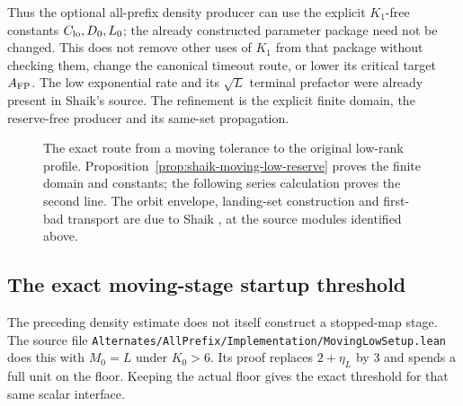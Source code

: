 \documentclass[11pt]{article}
\theoremstyle{remark}\newtheorem{remark}[proposition]{Remark}
\begin{document}
Thus the optional all-prefix density producer can use the explicit
\(K_1\)-free constants \(C_{\rm lo},D_0,L_0\); the already constructed
parameter package need not be changed. This does not remove other
uses of \(K_1\) from that package without checking them, change the
canonical timeout route, or lower its critical target \(A_{\rm FP}\).
The low exponential rate and its \(\sqrt L\) terminal prefactor were
already present in Shaik's source. The refinement is the explicit
finite domain, the reserve-free producer and its same-set propagation.

\begin{figure}[ht]
\centering
{}
\caption{The exact route from a moving tolerance to the original low-rank
profile. Proposition~\ref{prop:shaik-moving-low-reserve} proves the finite
domain and constants; the following series calculation proves the second
line. The orbit envelope, landing-set construction and first-bad transport
are due to Shaik \cite{Shaik2026v324}, at the source modules identified above.}
\end{figure}

\subsection{The exact moving-stage startup threshold}

The preceding density estimate does not itself construct a stopped-map
stage. The source file
\texttt{Alternates/AllPrefix/Implementation/MovingLowSetup.lean}
does this with \(M_0=L\) under \(K_0>6\).
Its proof replaces \(2+\eta_L\) by \(3\) and spends a full unit
on the floor. Keeping the actual floor gives the exact threshold
for that same scalar interface.
\end{document}
